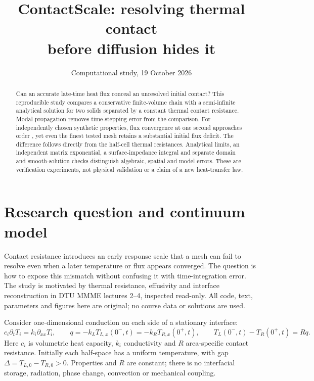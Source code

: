 \documentclass[11pt,a4paper]{article}
\title{ContactScale: resolving thermal contact\protect\\before diffusion hides it}
\author{}
\date{Computational study, 19 October 2026}
\begin{document}
\maketitle
\vspace{-2em}
\begin{abstract}
Can an accurate late-time heat flux conceal an unresolved initial contact?
This reproducible study compares a conservative finite-volume chain with a
semi-infinite analytical solution for two solids separated by a constant thermal
contact resistance. Modal propagation removes time-stepping error from the
comparison. For independently chosen synthetic properties, flux convergence at
one second approaches order \FinalOrder, yet even the finest tested mesh retains
a substantial initial flux deficit. The difference follows directly from the
half-cell thermal resistances. Analytical limits, an independent matrix
exponential, a surface-impedance integral and separate domain and smooth-solution
checks distinguish algebraic, spatial and model errors. These are verification
experiments, not physical validation or a claim of a new heat-transfer law.
\end{abstract}

\section{Research question and continuum model}
Contact resistance introduces an early response scale that a mesh can fail to
resolve even when a later temperature or flux appears converged. The question is
how to expose this mismatch without confusing it with time-integration error.
The study is motivated by thermal resistance, effusivity and interface
reconstruction in DTU MMME lectures 2--4, inspected read-only. All code, text,
parameters and figures here are original; no course data or solutions are used.

Consider one-dimensional conduction on each side of a stationary interface:
\begin{equation}
 c_i\partial_t T_i=k_i\partial_{xx}T_i,\qquad
 q=-k_L T_{L,x}(0^-,t)=-k_R T_{R,x}(0^+,t),\qquad
 T_L(0^-,t)-T_R(0^+,t)=Rq. \label{eq:pde}
\end{equation}
Here $c_i$ is volumetric heat capacity, $k_i$ conductivity and $R$ area-specific
contact resistance. Initially each half-space has a uniform temperature, with
gap $\Delta=T_{L,0}-T_{R,0}>0$. Properties and $R$ are constant; there is no
interfacial storage, radiation, phase change, convection or mechanical coupling.
\end{document}

